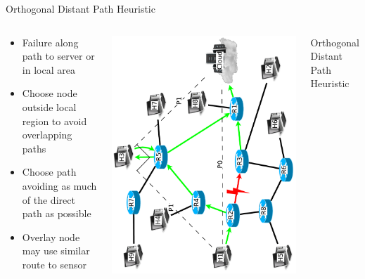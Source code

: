 \documentclass[pdftex]{beamer}
\begin{document}
\begin{frame}{Orthogonal Distant Path Heuristic}
\begin{columns}
\begin{column}{.5\textwidth}


\begin{itemize}
	\item Failure along path to server or in local area
	\item Choose node outside local	region to avoid overlapping	paths
	\item Choose path avoiding as much of the direct path as possible
	\item Overlay node may use similar route to sensor
\end{itemize}
\end{column}
	
\begin{column}{.5\textwidth}
\includegraphics[height=\textwidth,angle=-90]{angular_path}
\end{column}



\begin{frame}{Orthogonal Distant Path Heuristic}
\begin{columns}
\begin{column}{.5\textwidth}


\end{column}
\end{columns}
\end{frame}
\end{columns}
\end{frame}
\end{document}
